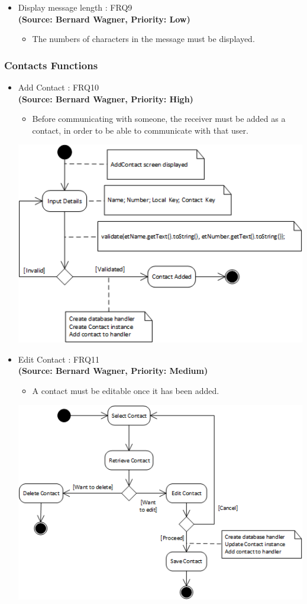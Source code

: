 \begin{itemize}
\item{Display message length : FRQ9}\\
\textbf{(Source: Bernard Wagner, Priority: Low)}
\begin{itemize}
\item The numbers of characters in the message must be displayed.
\end{itemize}
\end{itemize}
\subsubsection{Contacts Functions}
\begin{itemize}
\item{Add Contact : FRQ10}\\
\textbf{(Source: Bernard Wagner, Priority: High)}
\begin{itemize}
\item Before communicating with someone, the receiver must be added as a contact, in order to be able to communicate with that user.
\end{itemize}
 \includegraphics[width=13cm]{diagrams/StateDiagrams/AddContactStateDiagram.png}
\item{Edit Contact : FRQ11}\\
\textbf{(Source: Bernard Wagner, Priority: Medium)}
\begin{itemize}
\item A contact must be editable once it has been added.
\end{itemize}
 \includegraphics[width=13cm]{diagrams/StateDiagrams/EditContactStateDiagram.png}

\end{itemize}
